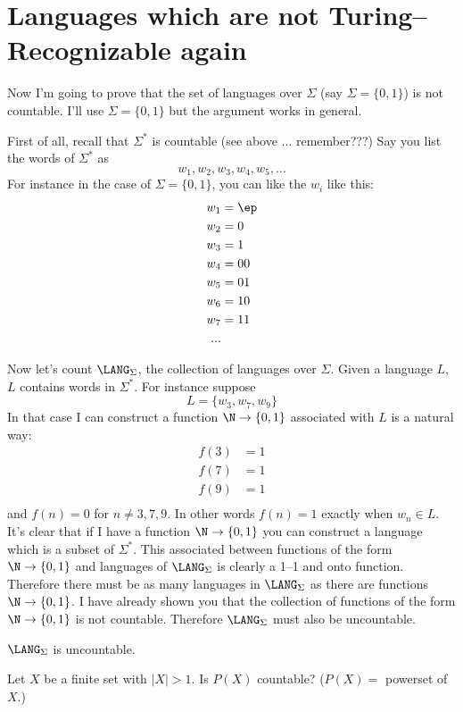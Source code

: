 \section{Languages which are not Turing--Recognizable again}
Now I'm going to prove that the 
set of languages over $\Sigma$ (say $\Sigma = \{0, 1\}$)
is not countable.
I'll use $\Sigma = \{0, 1\}$ but the argument works in general.

First of all, recall that $\Sigma^*$ is countable
(see above ... remember???)
Say you list the words of $\Sigma^*$ as
\[
w_1, w_2, w_3, w_4, w_5, \ldots
\]
For instance in the case of $\Sigma = \{0, 1\}$,
you can like the $w_i$ like this:
\begin{align*}
w_1 &= \ep \\
w_2 &= 0 \\
w_3 &= 1 \\
w_4 &= 00 \\
w_5 &= 01 \\
w_6 &= 10 \\
w_7 &= 11 \\
...
\end{align*}


Now let's count $\LANG_\Sigma$, the collection of languages over $\Sigma$.
Given a language $L$,
$L$ contains words in $\Sigma^*$.
For instance suppose
\[
L = \{w_3, w_7, w_9\}
\]
In that case I can construct a function $\N \rightarrow \{0,1\}$
associated with $L$ is a natural way:
\begin{align*}
f(3) &= 1 \\
f(7) &= 1 \\
f(9) &= 1 \\
\end{align*}
and $f(n) = 0$ for $n \neq 3, 7, 9$.
In other words 
$f(n) = 1$ exactly when $w_n \in L$.
It's clear that if I have a function $\N \rightarrow \{0, 1\}$
you can construct a language which is a subset of $\Sigma^*$.
This associated between functions of the form $\N \rightarrow \{0, 1\}$
and languages of $\LANG_\Sigma$ is clearly
a 1--1 and onto function.
Therefore 
there must be as many languages in $\LANG_\Sigma$
as there are functions $\N\rightarrow \{0, 1\}$.
I have already shown you that the collection of functions
of the form $\N \rightarrow \{0,1\}$ is not countable.
Therefore $\LANG_\Sigma$ must also be uncountable.

\begin{thm}
$\LANG_\Sigma$ 
is uncountable.
\end{thm}

\begin{ex}
Let $X$ be a finite set with $|X| > 1$.
Is $P(X)$ countable? ($P(X) = $ powerset of $X$.)
\end{ex}

